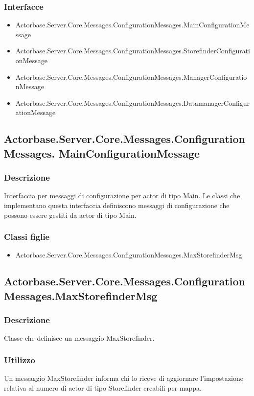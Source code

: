 \documentclass[a4paper]{article}
\begin{document}
			\subsubsection{Interfacce}
			\begin{itemize}
				\item Actorbase.Server.Core.Messages.ConfigurationMessages.MainConfigurationMessage
				\item Actorbase.Server.Core.Messages.ConfigurationMessages.StorefinderConfigurationMessage
				\item Actorbase.Server.Core.Messages.ConfigurationMessages.ManagerConfigurationMessage
				\item Actorbase.Server.Core.Messages.ConfigurationMessages.DatamanagerConfigurationMessage
			\end{itemize}

			\subsection{Actorbase.Server.Core.Messages.ConfigurationMessages.
			MainConfigurationMessage}
			\subsubsection{Descrizione}
				Interfaccia per messaggi di configurazione per actor di tipo Main. 
				Le classi che implementano questa interfaccia definiscono messaggi di configurazione che possono essere gestiti da actor di tipo Main.
			\subsubsection{Classi figlie}
			\begin{itemize}
				\item Actorbase.Server.Core.Messages.ConfigurationMessages.MaxStorefinderMsg
			\end{itemize}

			\subsection{Actorbase.Server.Core.Messages.ConfigurationMessages.MaxStorefinderMsg}
			\subsubsection{Descrizione}
				Classe che definisce un messaggio MaxStorefinder.
			\subsubsection{Utilizzo}
				Un messaggio MaxStorefinder informa chi lo riceve di aggiornare l'impostazione relativa al numero di actor di tipo Storefinder creabili per mappa.
\end{document}
